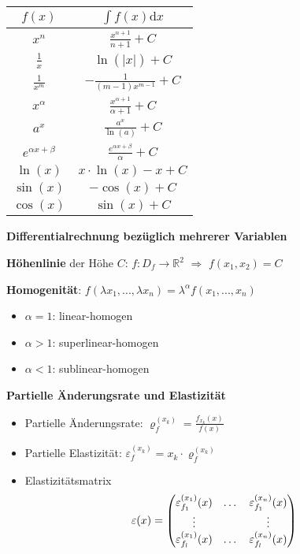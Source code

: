 \documentclass[10pt,landscape,a4paper]{article}
\begin{document}
\begin{multicols*}{4}
\begin{center}
	\begin{tabular}{c|c}
		$f(x)$ & $\int f(x)\mathrm{d}x$ \\
		\hline
		$x^n$ & $\frac{x^{n+1}}{n+1}+C$ \\
		$\frac{1}{x}$ & $\ln(\vert x\vert) + C$ \\
		$\frac{1}{x^m}$ & $-\frac{1}{(m-1)x^{m-1}}+C$ \\
		$x^\alpha$ & $\frac{x^{\alpha+1}}{\alpha+1}+C$ \\
		$a^x$ & $\frac{a^x}{\ln(a)}+C$ \\
		$e^{\alpha x+\beta}$ & $\frac{e^{\alpha x+\beta}}{\alpha}+C$ \\
		$\ln(x)$ & $x\cdot\ln(x)-x+C$ \\
		$\sin(x)$ & $-\cos(x)+C$ \\
		$\cos(x)$ & $\sin(x)+C$
	\end{tabular}
\end{center}

\begin{center}
	\normalsize{\textbf{Differentialrechnung bezüglich mehrerer Variablen}}
\end{center}

\textbf{Höhenlinie} der Höhe $C$: $f:D_f\to\mathbb{R}^2$ $\Rightarrow$ $f(x_1,x_2)=C$

\textbf{Homogenität}: $f(\lambda x_1,...,\lambda x_n) = \lambda^\alpha f(x_1,...,x_n)$
\begin{itemize}
	\item $\alpha=1$: linear-homogen
	\item $\alpha>1$: superlinear-homogen
	\item $\alpha<1$: sublinear-homogen
\end{itemize}

\textbf{Partielle Änderungsrate und Elastizität}
\begin{itemize}
	\item Partielle Änderungsrate: $\varrho_f^{(x_k)}=\frac{f_{x_k}(x)}{f(x)}$
	\item Partielle Elastizität: $\varepsilon_f^{(x_k)}=x_k\cdot\varrho_f^{(x_k)}$
	\item Elastizitätsmatrix
	\begin{align}
		\varepsilon(x)=\begin{pmatrix}
		\varepsilon_{f_1}^{(x_1)}(x) & \dots & \varepsilon_{f_1}^{(x_n)}(x) \\
		\vdots & & \vdots \\
		\varepsilon_{f_l}^{(x_1)}(x) & \dots & \varepsilon_{f_l}^{(x_n)}(x)
		\end{pmatrix} \notag
	\end{align}
\end{itemize}


\end{multicols*}
\end{document}
